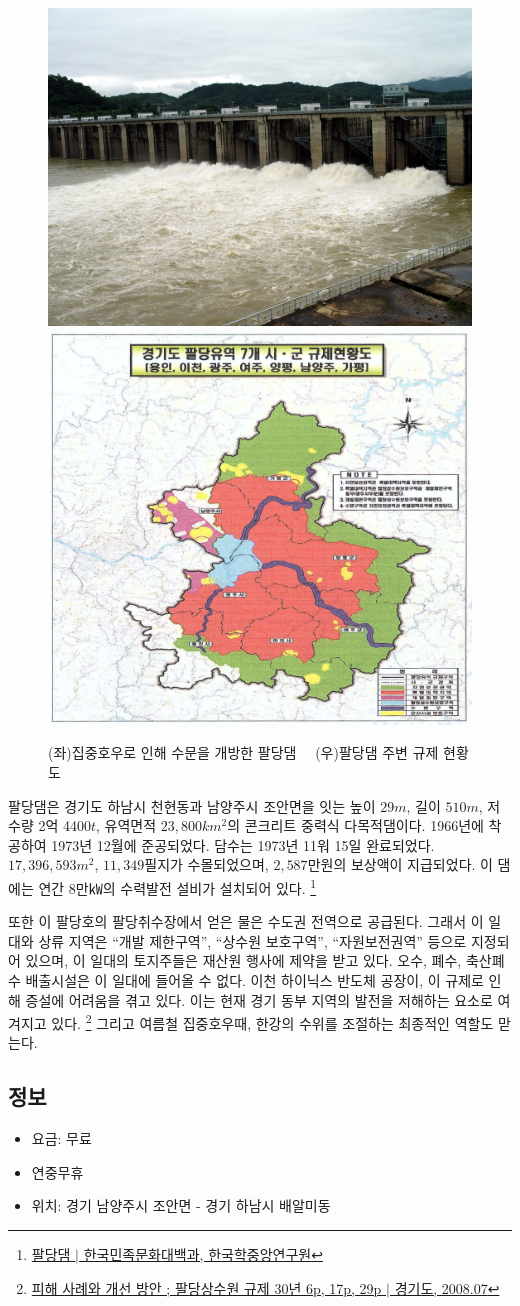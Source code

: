  
\begin{figure}
   \centering
   \includegraphics[width=.4\textwidth]{img/팔당댐.jpg}
   \includegraphics[width=.4\textwidth]{img/규제현황도.PNG}
    
   \caption{(좌)집중호우로 인해 수문을 개방한 팔당댐\protect\footnotemark $\quad$ (우)팔당댐 주변 규제 현황도\protect\footnotemark}
   \label{fig:my_labe9}
\end{figure}
\footnotetext{\ref{paldang}}


팔당댐은 경기도 하남시 천현동과 남양주시 조안면을 잇는
높이 $29m$, 길이 $510m$, 저수량 2억 4400$t$, 유역면적 $23,800km^2$의 콘크리트 중력식 다목적댐이다.
1966년에 착공하여 1973년 12월에 준공되었다.
담수는 1973년 11워 15일 완료되었다.
$17,396,593 m^2$, $11,349$필지가 수몰되었으며, $2,587$만원의 보상액이 지급되었다.
이 댐에는 연간 8만㎾의 수력발전 설비가 설치되어 있다.
\footnote{\href{https://terms.naver.com/entry.naver?docId=531161&cid=46631&categoryId=46631}{팔당댐 $|$ 한국민족문화대백과, 한국학중앙연구원}}


또한 이 팔당호의 팔당취수장에서 얻은 물은 수도권 전역으로 공급된다.
그래서 이 일대와 상류 지역은 ``개발 제한구역'', ``상수원 보호구역'', ``자원보전권역'' 
등으로 지정되어 있으며,
이 일대의 토지주들은 재산원 행사에 제약을 받고 있다.
오수, 폐수, 축산폐수 배출시설은 이 일대에 들어올 수 없다.
이천 하이닉스 반도체 공장이, 이 규제로 인해 증설에 어려움을 겪고 있다.
이는 현재 경기 동부 지역의 발전을 저해하는 요소로 여겨지고 있다.
\footnote{\label{paldang}\href{https://memory.library.kr/items/show/37492}{피해 사례와 개선 방안 ; 팔당상수원 규제 30년 6p, 17p, 29p $|$ 경기도, 2008.07}}
그리고 여름철 집중호우때, 한강의 수위를 조절하는 최종적인 역할도 맏는다.

\subsection{정보}
\begin{itemize}
    \item 요금: 무료
    \item 연중무휴
    \item 위치: 경기 남양주시 조안면 - 경기 하남시 배알미동
\end{itemize}